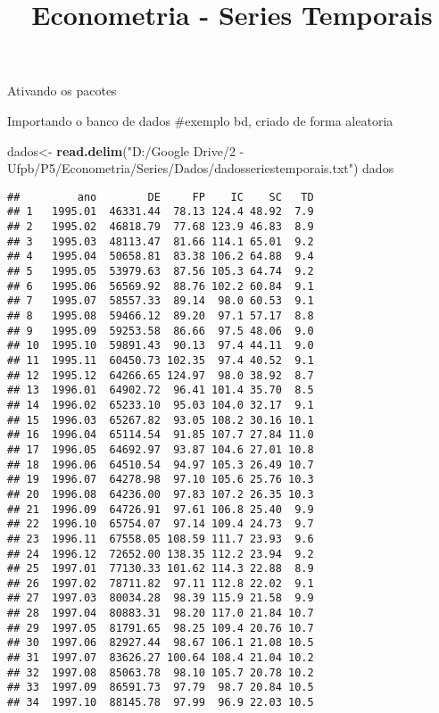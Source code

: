 \documentclass[]{article}
\title{Econometria - Series Temporais}
\author{}
\date{}
\newenvironment{Shaded}{\begin{snugshade}}{\end{snugshade}}
\newcommand{\KeywordTok}[1]{\textcolor[rgb]{0.13,0.29,0.53}{\textbf{#1}}}
\newcommand{\NormalTok}[1]{#1}
\newcommand{\StringTok}[1]{\textcolor[rgb]{0.31,0.60,0.02}{#1}}
\begin{document}
\maketitle

Ativando os pacotes

Importando o banco de dados \#exemplo bd, criado de forma aleatoria

\begin{Shaded}
\begin{Highlighting}[]
\NormalTok{dados<-}\StringTok{ }\KeywordTok{read.delim}\NormalTok{(}\StringTok{"D:/Google Drive/2 - Ufpb/P5/Econometria/Series/Dados/dadosseriestemporais.txt"}\NormalTok{)}
\NormalTok{dados}
\end{Highlighting}
\end{Shaded}

\begin{verbatim}
##         ano        DE     FP    IC    SC   TD
## 1   1995.01  46331.44  78.13 124.4 48.92  7.9
## 2   1995.02  46818.79  77.68 123.9 46.83  8.9
## 3   1995.03  48113.47  81.66 114.1 65.01  9.2
## 4   1995.04  50658.81  83.38 106.2 64.88  9.4
## 5   1995.05  53979.63  87.56 105.3 64.74  9.2
## 6   1995.06  56569.92  88.76 102.2 60.84  9.1
## 7   1995.07  58557.33  89.14  98.0 60.53  9.1
## 8   1995.08  59466.12  89.20  97.1 57.17  8.8
## 9   1995.09  59253.58  86.66  97.5 48.06  9.0
## 10  1995.10  59891.43  90.13  97.4 44.11  9.0
## 11  1995.11  60450.73 102.35  97.4 40.52  9.1
## 12  1995.12  64266.65 124.97  98.0 38.92  8.7
## 13  1996.01  64902.72  96.41 101.4 35.70  8.5
## 14  1996.02  65233.10  95.03 104.0 32.17  9.1
## 15  1996.03  65267.82  93.05 108.2 30.16 10.1
## 16  1996.04  65114.54  91.85 107.7 27.84 11.0
## 17  1996.05  64692.97  93.87 104.6 27.01 10.8
## 18  1996.06  64510.54  94.97 105.3 26.49 10.7
## 19  1996.07  64278.98  97.10 105.6 25.76 10.3
## 20  1996.08  64236.00  97.83 107.2 26.35 10.3
## 21  1996.09  64726.91  97.61 106.8 25.40  9.9
## 22  1996.10  65754.07  97.14 109.4 24.73  9.7
## 23  1996.11  67558.05 108.59 111.7 23.93  9.6
## 24  1996.12  72652.00 138.35 112.2 23.94  9.2
## 25  1997.01  77130.33 101.62 114.3 22.88  8.9
## 26  1997.02  78711.82  97.11 112.8 22.02  9.1
## 27  1997.03  80034.28  98.39 115.9 21.58  9.9
## 28  1997.04  80883.31  98.20 117.0 21.84 10.7
## 29  1997.05  81791.65  98.25 109.4 20.76 10.7
## 30  1997.06  82927.44  98.67 106.1 21.08 10.5
## 31  1997.07  83626.27 100.64 108.4 21.04 10.2
## 32  1997.08  85063.78  98.10 105.7 20.78 10.2
## 33  1997.09  86591.73  97.79  98.7 20.84 10.5
## 34  1997.10  88145.78  97.99  96.9 22.03 10.5

\end{verbatim}
\end{document}
